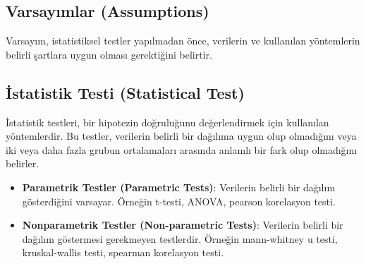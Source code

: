 \subsection{Varsayımlar (Assumptions)}
Varsayım, istatistiksel testler yapılmadan önce, verilerin ve kullanılan yöntemlerin belirli şartlara uygun olması gerektiğini belirtir.

\subsection{İstatistik Testi (Statistical Test)}
İstatistik testleri, bir hipotezin doğruluğunu değerlendirmek için kullanılan yöntemlerdir. Bu testler, verilerin belirli bir dağılıma uygun olup olmadığını veya iki veya daha fazla grubun ortalamaları arasında anlamlı bir fark olup olmadığını belirler. 

\begin{itemize}
	\item \textbf{Parametrik Testler (Parametric Tests)}: Verilerin belirli bir dağılım gösterdiğini varsayar. Örneğin t-testi, ANOVA, pearson korelasyon testi.
	\item \textbf{Nonparametrik Testler (Non-parametric Tests)}: Verilerin belirli bir dağılım göstermesi gerekmeyen testlerdir. Örneğin mann-whitney u testi, kruskal-wallis testi, spearman korelasyon testi.
\end{itemize}


\newpage